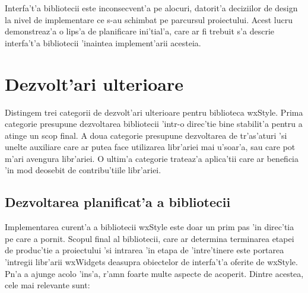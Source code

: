 Interfa't'a bibliotecii este inconsecvent'a pe alocuri, datorit'a deciziilor de design la nivel de implementare ce s-au schimbat pe parcursul proiectului. Acest lucru demonstreaz'a o lips'a de planificare ini'tial'a, care ar fi trebuit s'a descrie interfa't'a bibliotecii 'inaintea implement'arii acesteia.

\section{Dezvolt'ari ulterioare}

Distingem trei categorii de dezvolt'ari ulterioare pentru biblioteca wxStyle. Prima categorie presupune dezvoltarea bibliotecii 'intr-o direc'tie bine stabilit'a pentru a atinge un scop final. A doua categorie presupune dezvoltarea de tr'as'aturi 'si unelte auxiliare care ar putea face utilizarea libr'ariei mai u'soar'a, sau care pot m'ari avengura libr'ariei. O ultim'a categorie trateaz'a aplica'tii care ar beneficia 'in mod deosebit de contribu'tiile libr'ariei.

\subsection{Dezvoltarea planificat'a a bibliotecii}

Implementarea curent'a a bibliotecii wxStyle este doar un prim pas 'in direc'tia pe care a pornit. Scopul final al bibliotecii, care ar determina terminarea etapei de produc'tie a proiectului 'si intrarea 'in etapa de 'intre'tinere este portarea 'intregii libr'arii wxWidgets deasupra obiectelor de interfa't'a oferite de wxStyle. P{\ia}n'a a ajunge acolo 'ins'a, r'am{\ia}n foarte multe aspecte de acoperit. Dintre acestea, cele mai relevante sunt:

